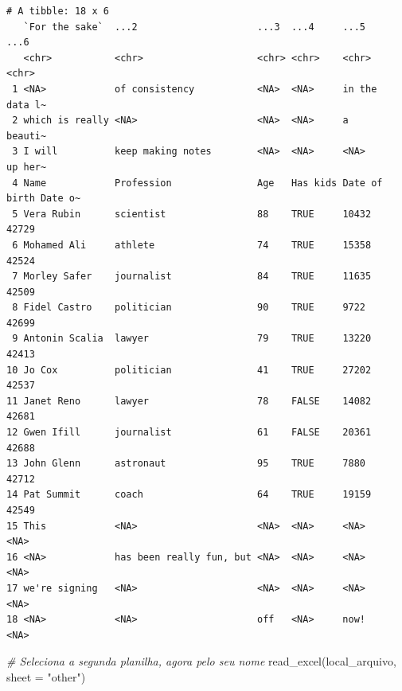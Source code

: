 \documentclass[
  brazilian,
]{book}
\newenvironment{Shaded}{\begin{snugshade}}{\end{snugshade}}
\newcommand{\AttributeTok}[1]{\textcolor[rgb]{0.77,0.63,0.00}{#1}}
\newcommand{\CommentTok}[1]{\textcolor[rgb]{0.56,0.35,0.01}{\textit{#1}}}
\newcommand{\FunctionTok}[1]{\textcolor[rgb]{0.00,0.00,0.00}{#1}}
\newcommand{\NormalTok}[1]{#1}
\newcommand{\StringTok}[1]{\textcolor[rgb]{0.31,0.60,0.02}{#1}}
\begin{document}
\begin{verbatim}
# A tibble: 18 x 6
   `For the sake`  ...2                     ...3  ...4     ...5          ...6   
   <chr>           <chr>                    <chr> <chr>    <chr>         <chr>  
 1 <NA>            of consistency           <NA>  <NA>     in the        data l~
 2 which is really <NA>                     <NA>  <NA>     a             beauti~
 3 I will          keep making notes        <NA>  <NA>     <NA>          up her~
 4 Name            Profession               Age   Has kids Date of birth Date o~
 5 Vera Rubin      scientist                88    TRUE     10432         42729  
 6 Mohamed Ali     athlete                  74    TRUE     15358         42524  
 7 Morley Safer    journalist               84    TRUE     11635         42509  
 8 Fidel Castro    politician               90    TRUE     9722          42699  
 9 Antonin Scalia  lawyer                   79    TRUE     13220         42413  
10 Jo Cox          politician               41    TRUE     27202         42537  
11 Janet Reno      lawyer                   78    FALSE    14082         42681  
12 Gwen Ifill      journalist               61    FALSE    20361         42688  
13 John Glenn      astronaut                95    TRUE     7880          42712  
14 Pat Summit      coach                    64    TRUE     19159         42549  
15 This            <NA>                     <NA>  <NA>     <NA>          <NA>   
16 <NA>            has been really fun, but <NA>  <NA>     <NA>          <NA>   
17 we're signing   <NA>                     <NA>  <NA>     <NA>          <NA>   
18 <NA>            <NA>                     off   <NA>     now!          <NA>   
\end{verbatim}

\begin{Shaded}
\begin{Highlighting}[]
\CommentTok{\# Seleciona a segunda planilha, agora pelo seu nome}
\FunctionTok{read\_excel}\NormalTok{(local\_arquivo, }\AttributeTok{sheet =} \StringTok{"other"}\NormalTok{)}
\end{Highlighting}
\end{Shaded}
\end{document}
